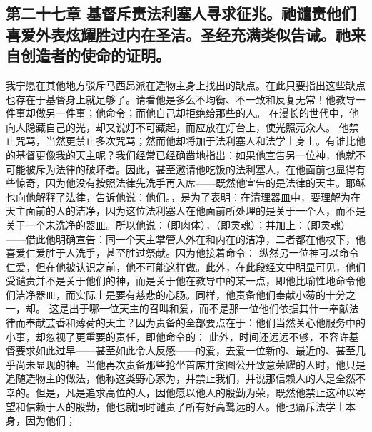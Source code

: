 
\subsection{第二十七章 基督斥责法利塞人寻求征兆。祂谴责他们喜爱外表炫耀胜过内在圣洁。圣经充满类似告诫。祂来自创造者的使命的证明。}

我宁愿在其他地方驳斥马西昂派在造物主身上找出的缺点。在此只要指出这些缺点也存在于基督身上就足够了。请看他是多么不均衡、不一致和反复无常！他教导一件事却做另一件事；他命令；而他自己却拒绝给那些的人。 在漫长的世代中，他向人隐藏自己的光，却又说灯不可藏起，而应放在灯台上，使光照亮众人。 他禁止咒骂，当然更禁止多次咒骂；然而他却将加于法利塞人和法学士身上。有谁比他的基督更像我的天主呢？我们经常已经确凿地指出：如果他宣告另一位神，他就不可能被斥为法律的破坏者。因此，甚至邀请他吃饭的法利塞人，在他面前也显得有些惊奇，因为他没有按照法律先洗手再入席——既然他宣告的是法律的天主。耶稣也向他解释了法律，告诉他说：他们。，是为了表明：在清理器皿中，要理解为在天主面前的人的洁净，因为这位法利塞人在他面前所处理的是关于一个人，而不是关于一个未洗净的器皿。所以他说：（即肉体），（即灵魂）；并加上：（即灵魂）——借此他明确宣告：同一个天主掌管人外在和内在的洁净，二者都在他权下，他喜爱仁爱胜于人洗手，甚至胜过祭献。因为他接着命令： 纵然另一位神可以命令仁爱，但在他被认识之前，他不可能这样做。此外，在此段经文中明显可见，他们受谴责并不是关于他们的神，而是关于他在教导中的某一点，即他比喻性地命令他们洁净器皿，而实际上是要有慈悲的心肠。同样，他责备他们奉献小茐的十分之一，却。 这是出于哪一位天主的召叫和爱，而不是那一位他们依据其什一奉献法律而奉献芸香和薄荷的天主？因为责备的全部要点在于：他们当然关心他服务中的小事，却忽视了更重要的责任，即他命令的： 此外，时间还远远不够，不容许基督要求如此过早——甚至如此令人反感——的爱，去爱一位新的、最近的、甚至几乎尚未显现的神。当他再次责备那些抢坐首席并贪图公开致意荣耀的人时，他只是追随造物主的做法，他称这类野心家为，并禁止我们，并说那信赖人的人是全然不幸的。但是，凡是追求高位的人，因他愿以他人的殷勤为荣，既然他禁止这种以寄望和信赖于人的殷勤，他也就同时谴责了所有好高鹜远的人。他也痛斥法学士本身，因为他们； 